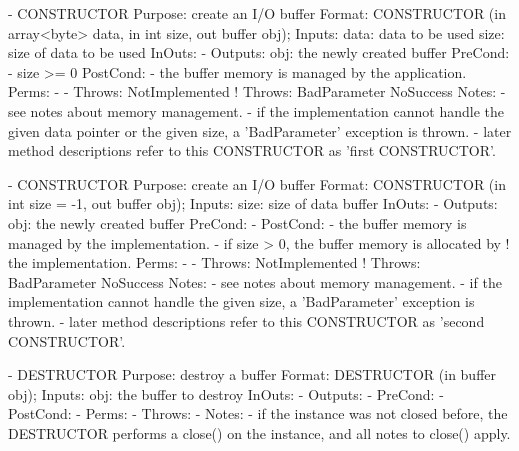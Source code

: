  \begin{myspec}
    - CONSTRUCTOR
      Purpose:  create an I/O buffer
      Format:   CONSTRUCTOR          (in  array<byte> data,
                                      in  int         size,
                                      out buffer      obj);
      Inputs:   data:                 data to be used
                size:                 size of data to be used
      InOuts:   -
      Outputs:  obj:                  the newly created buffer
      PreCond:  - size >= 0
      PostCond: - the buffer memory is managed by the
                  application.
      Perms:    -
-     Throws:   NotImplemented
!     Throws:   BadParameter
                NoSuccess
      Notes:    - see notes about memory management.
                - if the implementation cannot handle the 
                  given data pointer or the given size, a 
                  'BadParameter' exception is thrown.
                - later method descriptions refer to this
                  CONSTRUCTOR as 'first CONSTRUCTOR'.
 
 
    - CONSTRUCTOR
      Purpose:  create an I/O buffer
      Format:   CONSTRUCTOR          (in  int         size = -1,
                                      out buffer      obj);
      Inputs:   size:                 size of data buffer
      InOuts:   -
      Outputs:  obj:                  the newly created buffer
      PreCond:  -
      PostCond: - the buffer memory is managed by the
                  implementation.
                - if size > 0, the buffer memory is allocated by
!                 the implementation.
      Perms:    -
-     Throws:   NotImplemented
!     Throws:   BadParameter
                NoSuccess
      Notes:    - see notes about memory management.
                - if the implementation cannot handle the 
                  given size, a 'BadParameter' exception is 
                  thrown.
                - later method descriptions refer to this
                  CONSTRUCTOR as 'second CONSTRUCTOR'.
 
 
    - DESTRUCTOR
      Purpose:  destroy a buffer
      Format:   DESTRUCTOR           (in  buffer obj);
      Inputs:   obj:                  the buffer to destroy
      InOuts:   -
      Outputs:  -
      PreCond:  -
      PostCond: -
      Perms:    -
      Throws:   -
      Notes:    - if the instance was not closed before, the 
                  DESTRUCTOR performs a close() on the instance,
                  and all notes to close() apply.
 

\end{myspec}

